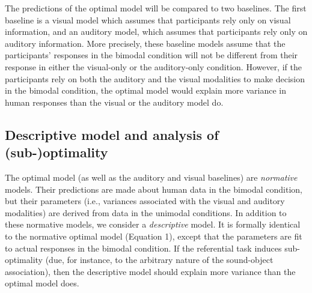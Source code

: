 \documentclass[english,,man,floatsintext]{apa6}
\theoremstyle{definition}
\theoremstyle{definition}
\theoremstyle{definition}
\theoremstyle{remark}
\begin{document}
The predictions of the optimal model will be compared to two baselines.
The first baseline is a visual model which assumes that participants
rely only on visual information, and an auditory model, which assumes
that participants rely only on auditory information. More precisely,
these baseline models assume that the participants' responses in the
bimodal condition will not be different from their response in either
the visual-only or the auditory-only condition. However, if the
participants rely on both the auditory and the visual modalities to make
decision in the bimodal condition, the optimal model would explain more
variance in human responses than the visual or the auditory model do.

\subsection{Descriptive model and analysis of
(sub-)optimality}\label{descriptive-model-and-analysis-of-sub-optimality}

The optimal model (as well as the auditory and visual baselines) are
\emph{normative} models. Their predictions are made about human data in
the bimodal condition, but their parameters (i.e., variances associated
with the visual and auditory modalities) are derived from data in the
unimodal conditions. In addition to these normative models, we consider
a \emph{descriptive} model. It is formally identical to the normative
optimal model (Equation 1), except that the parameters are fit to actual
responses in the bimodal condition. If the referential task induces
sub-optimality (due, for instance, to the arbitrary nature of the
sound-object association), then the descriptive model should explain
more variance than the optimal model does.
\end{document}

